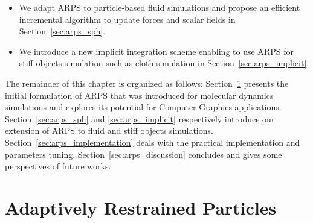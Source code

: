 \begin{itemize}
\item We adapt ARPS to particle-based fluid simulations and propose an efficient incremental algorithm to update forces and scalar fields in Section~\ref{sec:arps_sph}.
\item We introduce a new implicit integration scheme enabling to use ARPS for stiff objects simulation such as cloth simulation in Section~\ref{sec:arps_implicit}.
\end{itemize}
The remainder of this chapter is organized as follows: 
Section~\ref{sec:arps_basics} presents the initial formulation of ARPS that was introduced for molecular dynamics simulations and explores its potential for Computer Graphics applications. 
Section~\ref{sec:arps_sph} and \ref{sec:arps_implicit} respectively introduce our extension of ARPS to fluid and stiff objects simulations. 
Section~\ref{sec:arps_implementation} deals with the practical implementation and parameters tuning. 
Section~\ref{sec:arps_discussion} concludes and gives some perspectives of future works.

\section{Adaptively Restrained Particles} 
\label{sec:arps_basics}
